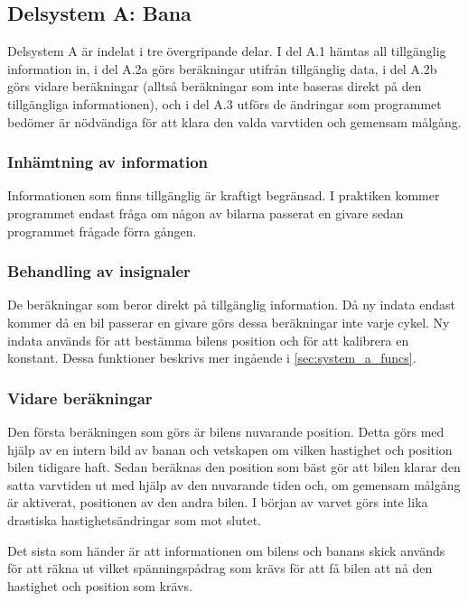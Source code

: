   \subsection{Delsystem A: Bana}
  
  Delsystem A är indelat i tre övergripande delar. I del A.1 hämtas all
  tillgänglig information in, i del A.2a görs beräkningar utifrån tillgänglig
  data, i del A.2b görs vidare beräkningar (alltså beräkningar som inte baseras
  direkt på den tillgängliga informationen), och i del A.3 utförs de ändringar
  som programmet bedömer är nödvändiga för att klara den valda varvtiden och
  gemensam målgång. 

    \subsubsection{Inhämtning av information}

    Informationen som finns tillgänglig är kraftigt begränsad. I praktiken
    kommer programmet endast fråga om någon av bilarna passerat en givare sedan
    programmet frågade förra gången.

    \subsubsection{Behandling av insignaler}

    De beräkningar som beror direkt på tillgänglig information. Då ny indata
    endast kommer då en bil passerar en givare görs dessa beräkningar inte
    varje cykel.  Ny indata används för att bestämma bilens position och för
    att kalibrera en konstant. Dessa funktioner beskrivs mer ingående i
    \ref{sec:system_a_funcs}.

    \subsubsection{Vidare beräkningar}
    
    Den första beräkningen som görs är bilens nuvarande position. Detta görs
    med hjälp av en intern bild av banan och vetskapen om vilken hastighet och
    position bilen tidigare haft. Sedan beräknas den position som bäst gör att
    bilen klarar den satta varvtiden ut med hjälp av den nuvarande tiden och,
    om gemensam målgång är aktiverat, positionen av den andra bilen.  I början
    av varvet görs inte lika drastiska hastighetsändringar som mot slutet.

    Det sista som händer är att informationen om bilens och banans skick
    används för att räkna ut vilket spänningspådrag som krävs för att få bilen
    att nå den hastighet och position som krävs.

